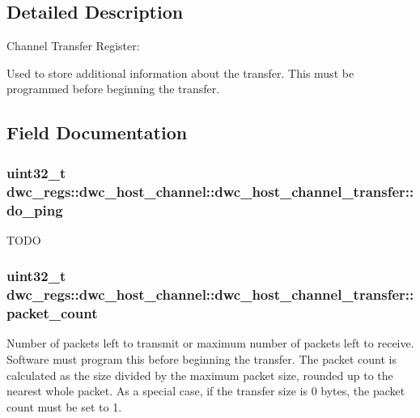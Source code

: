 \subsection{Detailed Description}
Channel Transfer Register\-:

Used to store additional information about the transfer. This must be programmed before beginning the transfer. 

\subsection{Field Documentation}
\hypertarget{uniondwc__regs_1_1dwc__host__channel_1_1dwc__host__channel__transfer_a52b9cb0efb209bf308329bb76cb2a378}{
\subsubsection[{do\-\_\-ping}]{\setlength{\rightskip}{0pt plus 5cm}uint32\-\_\-t dwc\-\_\-regs\-::dwc\-\_\-host\-\_\-channel\-::dwc\-\_\-host\-\_\-channel\-\_\-transfer\-::do\-\_\-ping}}\label{uniondwc__regs_1_1dwc__host__channel_1_1dwc__host__channel__transfer_a52b9cb0efb209bf308329bb76cb2a378}
T\-O\-D\-O \hypertarget{uniondwc__regs_1_1dwc__host__channel_1_1dwc__host__channel__transfer_ab49dd416024ced5f78321eeebea56b86}{
\subsubsection[{packet\-\_\-count}]{\setlength{\rightskip}{0pt plus 5cm}uint32\-\_\-t dwc\-\_\-regs\-::dwc\-\_\-host\-\_\-channel\-::dwc\-\_\-host\-\_\-channel\-\_\-transfer\-::packet\-\_\-count}}\label{uniondwc__regs_1_1dwc__host__channel_1_1dwc__host__channel__transfer_ab49dd416024ced5f78321eeebea56b86}
Number of packets left to transmit or maximum number of packets left to receive. Software must program this before beginning the transfer. The packet count is calculated as the size divided by the maximum packet size, rounded up to the nearest whole packet. As a special case, if the transfer size is 0 bytes, the packet count must be set to 1.

